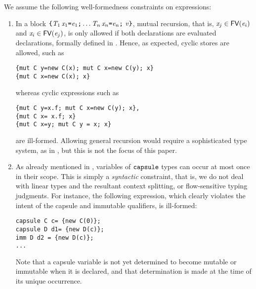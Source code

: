 We assume the following well-formedness constraints on expressions:
\begin{enumerate}
\item In a block $\texttt{\{}\mathit{T}_1\,\mathit{x}_1\texttt{=}\mathit{e}_1\texttt{;}\ldots\mathit{T}_n\,\mathit{x}_n\texttt{=}\mathit{e}_n\texttt{;}\ \mathit{v}\texttt{\}}$, mutual recursion, that is, $\mathit{x}_j\in\textsf{FV}(\mathit{e}_i)$ and $\mathit{x}_i\in\textsf{FV}(\mathit{e}_j)$, is only allowed if both declarations are {evaluated declarations, formally defined in }. Hence, as expected, cyclic stores are allowed, such as
\begin{lstlisting}
{mut C y=new C(x); mut C x=new C(y); x}
{mut C x=new C(x); x}
\end{lstlisting}
whereas cyclic expressions such as
\begin{lstlisting}
{mut C y=x.f; mut C x=new C(y); x}, 
{mut C x= x.f; x}
{mut C x=y; mut C y = x; x}
\end{lstlisting}
are ill-formed. Allowing general recursion would require a sophisticated type system, 
as in \cite{ServettoEtAl13}, but this is not the focus of this paper.
\item As already mentioned in , variables of $\texttt{capsule}$ types can occur at most once in their scope. \label{linearity}
This is simply a \emph{syntactic} constraint, that is, we do not 
deal with linear types and the resultant context splitting, or flow-sensitive typing judgments. For instance, the following expression, which clearly
violates the intent of the capsule and immutable qualifiers, is ill-formed:
\begin{lstlisting}
capsule C c= {new C(0)}; 
capsule D d1= {new D(c)}; 
imm D d2 = {new D(c)}; 
...
\end{lstlisting}
Note that a capsule variable is not yet determined to
become mutable or immutable when it is declared, and that determination is made at the time of its unique occurrence.
\end{enumerate}

